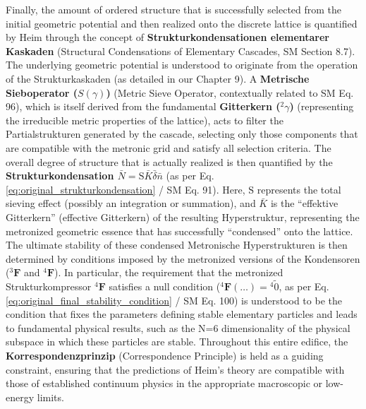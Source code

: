 \documentclass[12pt]{article}
\newcommand{\q}[1]{\enquote{#1}}
\newcommand{\metrischesieboperator}{S(\gamma)}
\newcommand{\metronisiertekondensor}[1]{{}^{#1}\mathbf{F}} %
\begin{document}
Finally, the amount of ordered structure that is successfully selected from the initial geometric potential and then realized onto the discrete lattice is quantified by Heim through the concept of \textbf{Strukturkondensationen elementarer Kaskaden} (Structural Condensations of Elementary Cascades, SM Section 8.7). The underlying geometric potential is understood to originate from the operation of the Strukturkaskaden (as detailed in our Chapter 9). A \textbf{Metrische Sieboperator (\( \metrischesieboperator \))} (Metric Sieve Operator, contextually related to SM Eq. 96), which is itself derived from the fundamental \textbf{Gitterkern (\({}^2\gamma\))} (representing the irreducible metric properties of the lattice), acts to filter the Partialstrukturen generated by the cascade, selecting only those components that are compatible with the metronic grid and satisfy all selection criteria. The overall degree of structure that is actually realized is then quantified by the \textbf{Strukturkondensation \( \bar{N} = \mathrm{S}\bar{K}\bar{\delta}\bar{n} \)} (as per Eq. \eqref{eq:original_strukturkondensation} / SM Eq. 91). Here, \( \mathrm{S} \) represents the total sieving effect (possibly an integration or summation), and \( \bar{K} \) is the \q{effektive Gitterkern} (effective Gitterkern) of the resulting Hyperstruktur, representing the metronized geometric essence that has successfully \q{condensed} onto the lattice. The ultimate stability of these condensed Metronische Hyperstrukturen is then determined by conditions imposed by the metronized versions of the Kondensoren (\( \metronisiertekondensor{3} \) and \( \metronisiertekondensor{4} \)). In particular, the requirement that the metronized Strukturkompressor \( \metronisiertekondensor{4} \) satisfies a null condition (\( \metronisiertekondensor{4}(\dots) = {}^{4}\tilde{0} \), as per Eq. \eqref{eq:original_final_stability_condition} / SM Eq. 100) is understood to be the condition that fixes the parameters defining stable elementary particles and leads to fundamental physical results, such as the N=6 dimensionality of the physical subspace in which these particles are stable. Throughout this entire edifice, the \textbf{Korrespondenzprinzip} (Correspondence Principle) is held as a guiding constraint, ensuring that the predictions of Heim's theory are compatible with those of established continuum physics in the appropriate macroscopic or low-energy limits.
\end{document}
